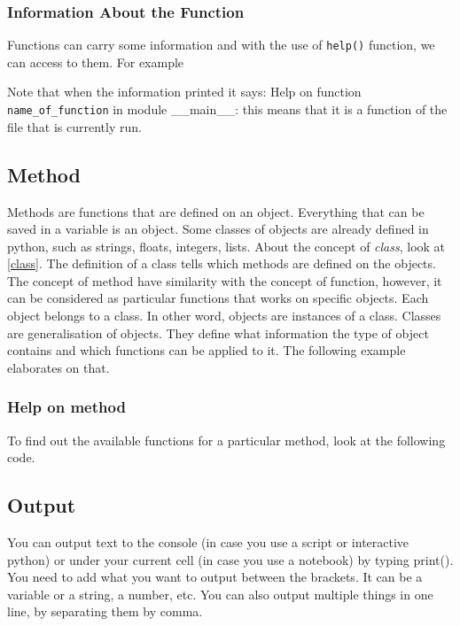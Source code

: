 \documentclass[10pt,a4paper]{article}
\begin{document}
\subsubsection{Information About  the  Function} \label{help_function}
Functions can carry some information and with the use of \texttt{help()} function, we can access to them. For example

Note that when the information printed it says: Help on function \texttt{name\_of\_function} in module \_\_main\_\_:
this means that it is a function of the file that is currently run.
\subsection{Method}
Methods are functions that are defined on an object. Everything that can be saved in a variable is an object. Some classes of objects are already defined in python, such as strings, floats, integers, lists. About the concept of \textit{class}, look at \ref{class}. The definition of  a class tells which methods are defined on the objects. The concept of  method have similarity with the concept of function, however, it can be considered as particular functions that works on specific objects.  Each object belongs to a class. In other word, objects are instances of a class. Classes are generalisation of objects. They define what information the type of object contains and which functions can be applied to it. The following example elaborates on that.


\subsubsection{Help on method}
To find out the available functions for a particular method, look at the following code.






\subsection{Output}
You can output text to the console (in case you use a script or interactive python) or under your current cell (in case you use a notebook) by typing print(). You need to add what you want to output between the brackets. It can be a variable or a string, a number, etc.
You can also output multiple things in one line, by separating them by comma.
\end{document}
